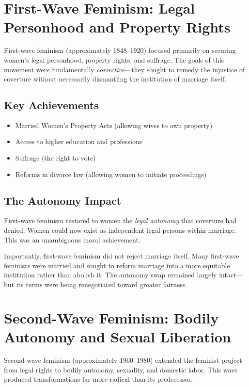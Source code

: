 \documentclass[12pt,openany]{book}
\numberwithin{equation}{chapter}
\begin{document}
\section{First-Wave Feminism: Legal Personhood and Property Rights}

First-wave feminism (approximately 1848--1920) focused primarily on securing women's legal personhood, property rights, and suffrage. The goals of this movement were fundamentally \textit{corrective}---they sought to remedy the injustice of coverture without necessarily dismantling the institution of marriage itself.

\subsection{Key Achievements}

\begin{itemize}
    \item Married Women's Property Acts (allowing wives to own property)
    \item Access to higher education and professions
    \item Suffrage (the right to vote)
    \item Reforms in divorce law (allowing women to initiate proceedings)
\end{itemize}

\subsection{The Autonomy Impact}

First-wave feminism restored to women the \textit{legal autonomy} that coverture had denied. Women could now exist as independent legal persons within marriage. This was an unambiguous moral achievement.

Importantly, first-wave feminism did not reject marriage itself. Many first-wave feminists were married and sought to reform marriage into a more equitable institution rather than abolish it. The autonomy swap remained largely intact---but its terms were being renegotiated toward greater fairness.

\section{Second-Wave Feminism: Bodily Autonomy and Sexual Liberation}

Second-wave feminism (approximately 1960--1980) extended the feminist project from legal rights to bodily autonomy, sexuality, and domestic labor. This wave produced transformations far more radical than its predecessor.
\end{document}
